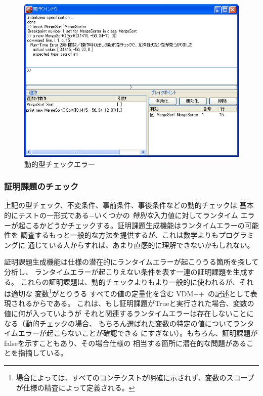 \documentclass[\pformat,12pt]{jarticle}
\newcommand{\vdmslpp}{VDM++}
\begin{document}
\begin{figure}[tbh]
\begin{center}
\includegraphics[width=12.5cm]{dynamicTCError-pp.png}
\caption{動的型チェックエラー}
\label{fig:dtcerror}
\end{center}
\end{figure}

\subsubsection{証明課題のチェック}\label{pogWalk}

上記の型チェック、不変条件、事前条件、事後条件などの動的チェックは
基本的にテストの一形式である−いくつかの \emph{特別な}入力値に対してランタイム
エラーが起こるかどうかチェックする。証明課題生成機能はランタイムエラーの可能性を
調査するもっと一般的な方法を提供するが、これは数学よりもプログラミングに
通じている人からすれば、あまり直感的に理解できないかもしれない。

証明課題生成機能は仕様の潜在的にランタイムエラーが起こりうる箇所を探して分析し、
ランタイムエラーが起こりえない条件を表す一連の証明課題を生成する。
これらの証明課題は、動的チェックよりもより一般的に使われるが、それは適切な
変数\footnote{
場合によっては、すべてのコンテクストが明確に示されず、変数のスコープが仕様の精査によって定義される。
}がとりうる
すべての値の定量化を含む \vdmslpp\ の記述として表現されるからである。
これは、もし証明課題がTrueと実行された場合、変数の値に何が入っていようが
それと関連するランタイムエラーは存在しないことになる（動的チェックの場合、
もちろん選ばれた変数の特定の値についてランタイムエラーが起こらないことが確認できる
にすぎない）。もちろん、証明課題がfalseを示すこともあり、その場合仕様の
相当する箇所に潜在的な問題があることを指摘している。
\end{document}
